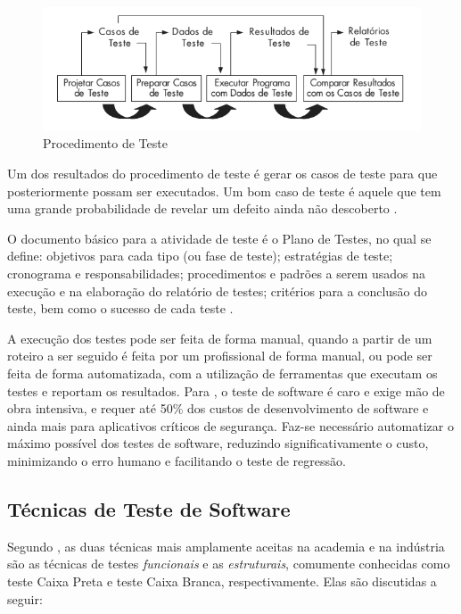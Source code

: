 \begin{figure}[!htb]
\centering
\includegraphics[width=.8\textwidth]{images/PTESTE.png}
\caption{Procedimento de Teste \cite{HIRAMA2011}}
\label{figure:PTESTE}
\end{figure}

Um dos resultados do procedimento de teste é gerar os casos de teste para que posteriormente possam ser executados.  Um bom caso de teste é aquele que tem uma grande probabilidade de revelar um defeito ainda não descoberto \cite{HIRAMA2011}.

O documento básico para a atividade de teste é o Plano de Testes, no qual se define: objetivos para cada tipo (ou fase de teste); estratégias de teste; cronograma e responsabilidades; procedimentos e padrões a serem usados na execução e na elaboração do relatório de testes; critérios para a conclusão do teste, bem como o sucesso de cada teste \cite{HIRAMA2011}.

A execução dos testes pode ser feita de forma manual, quando a partir de um roteiro a ser seguido é feita por um profissional de forma manual, ou pode ser feita de forma automatizada, com a utilização de ferramentas que executam os testes e reportam os resultados. Para , o teste de software é caro e exige mão de obra intensiva, e requer até 50\% dos custos de desenvolvimento de software e ainda mais para aplicativos críticos de segurança. Faz-se necessário automatizar o máximo possível dos testes de software, reduzindo significativamente o custo, minimizando o erro humano e facilitando o teste de regressão.


\subsection{Técnicas de Teste de Software}


Segundo , as duas técnicas mais amplamente aceitas na academia e na indústria são as técnicas de testes \textit{funcionais} e as \textit{estruturais}, comumente conhecidas como teste Caixa Preta e teste Caixa Branca, respectivamente. Elas são discutidas a seguir:



